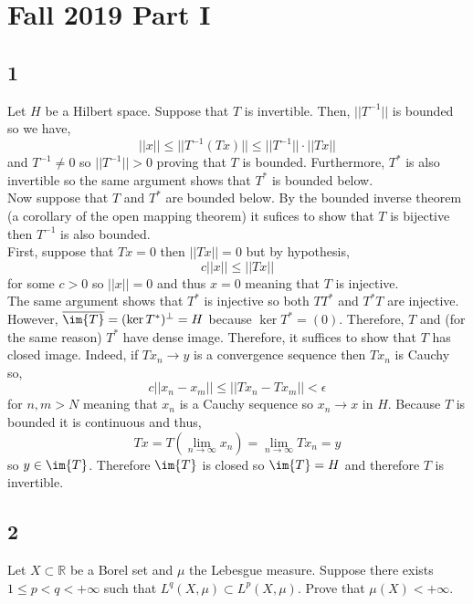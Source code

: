 \documentclass[12pt]{article}
\newcommand{\R}{\mathbb{R}}
\begin{document}
\section{Fall 2019 Part I}

\subsection{1}

Let $H$ be a Hilbert space. Suppose that $T$ is invertible. Then, $||T^{-1}||$ is bounded so we have,
\[ || x || \le || T^{-1} (T x) || \le || T^{-1} || \cdot || T x || \]
and $T^{-1} \neq 0$ so $|| T^{-1} || > 0$ proving that $T$ is bounded. Furthermore, $T^*$ is also invertible so the same argument shows that $T^*$ is bounded below.
\bigskip\\
Now suppose that $T$ and $T^*$ are bounded below. By the bounded inverse theorem (a corollary of the open mapping theorem) it sufices to show that $T$ is bijective then $T^{-1}$ is also bounded. 
\bigskip\\
First, suppose that $T x = 0$ then $|| T x || = 0$ but by hypothesis, 
\[ c || x || \le || T x || \]
for some $c > 0$ so $|| x || = 0$ and thus $x = 0$ meaning that $T$ is injective. 
\bigskip\\
The same argument shows that $T^*$ is injective so both $T T^*$ and $T^* T$ are injective. However, $\overline{\im{T}} = (\ker{T^*})^\perp = H$ because $\ker{T^*} = (0)$. Therefore, $T$ and (for the same reason) $T^*$ have dense image. Therefore, it suffices to show that $T$ has closed image. Indeed, if $T x_n \to y$ is a convergence sequence then $T x_n$ is Cauchy so,
\[ c || x_n - x_m || \le || T x_n - T x_m || < \epsilon \]
for $n, m > N$ meaning that $x_n$ is a Cauchy sequence so $x_n \to x$ in $H$. Because $T$ is bounded it is continuous and thus,
\[ Tx = T \left( \lim_{n \to \infty} x_n \right) = \lim_{n \to \infty} T x_n = y \]
so $y \in \im{T}$. Therefore $\im{T}$ is closed so $\im{T} = H$ and therefore $T$ is invertible.

\subsection{2}

\begin{exercise}
Let $X \subset \R$ be a Borel set and $\mu$ the Lebesgue measure. Suppose there exists $1 \le p < q < + \infty$ such that $L^q(X, \mu) \subset L^p(X, \mu)$. Prove that $\mu(X) < + \infty$.
\end{exercise}
\end{document}
